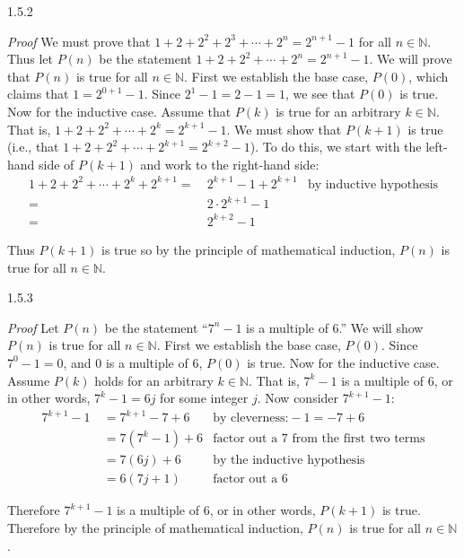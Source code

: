 \documentclass[11pt,]{book}
\makeatletter
\theoremstyle{ptxplainnotitle}
\theoremstyle{ptxplaintitle}
\renewcommand*{\proofname}{Proof}
\renewenvironment{proof}[1][\proofname]{\par
  \pushQED{\qed}%
  \normalfont \topsep6\p@\@plus6\p@\relax
  \trivlist
  \item\relax
    {\itshape
    #1\@addpunct{.}}\hspace\labelsep\ignorespaces
}{%
  \popQED\endtrivlist\@endpefalse
}
\theoremstyle{ptxdefinitionnotitle}
\theoremstyle{ptxdefinitiontitle}
\theoremstyle{ptxdefinitionnotitle}
\theoremstyle{ptxdefinitiontitle}
\theoremstyle{ptxdefinitionnotitle}
\theoremstyle{ptxdefinitiontitle}
\theoremstyle{ptxdefinitiontitlenonumber}
\theoremstyle{ptxdefinitiontitlenonumber}
\numberwithin{equation}{chapter}
\newcommand{\N}{\mathbb N}
\newcommand{\amp}{&}
\makeatother
\begin{document}
\begin{divisionexercise}{1.5.2}
\textbf{}\begin{proof}\hypertarget{proof-5}{}
\hypertarget{p-596}{}%
We must prove that \(1 + 2 + 2^2 + 2^3 + \cdots +2^n = 2^{n+1} - 1\) for all \(n \in \N\). Thus let \(P(n)\) be the statement \(1 + 2 + 2^2 + \cdots + 2^n = 2^{n+1} - 1\). We will prove that \(P(n)\) is true for all \(n \in \N\). First we establish the base case, \(P(0)\), which claims that \(1 = 2^{0+1} -1\). Since \(2^1 - 1 = 2 - 1 = 1\), we see that \(P(0)\) is true. Now for the inductive case. Assume that \(P(k)\) is true for an arbitrary \(k \in \N\). That is, \(1 + 2 + 2^2 + \cdots + 2^k = 2^{k+1} - 1\). We must show that \(P(k+1)\) is true (i.e., that \(1 + 2 + 2^2 + \cdots + 2^{k+1} = 2^{k+2} - 1\)). To do this, we start with the left-hand side of \(P(k+1)\) and work to the right-hand side:%
\begin{align*}
1 + 2 + 2^2 + \cdots + 2^k + 2^{k+1} = \amp ~ 2^{k+1} - 1 + 2^{k+1} \amp \text{by inductive hypothesis}\\
= \amp ~2\cdot 2^{k+1} - 1 \amp\\
= \amp ~ 2^{k+2} - 1 \amp
\end{align*}
%
\par
\hypertarget{p-597}{}%
Thus \(P(k+1)\) is true so by the principle of mathematical induction, \(P(n)\) is true for all \(n \in \N\).%
\end{proof}
\end{divisionexercise}%
\begin{divisionexercise}{1.5.3}
\textbf{}\begin{proof}\hypertarget{proof-6}{}
\hypertarget{p-599}{}%
Let \(P(n)\) be the statement ``\(7^n - 1\) is a multiple of 6.'' We will show \(P(n)\) is true for all \(n \in \N\). First we establish the base case, \(P(0)\). Since \(7^0 - 1 = 0\), and \(0\) is a multiple of 6, \(P(0)\) is true. Now for the inductive case. Assume \(P(k)\) holds for an arbitrary \(k \in \N\). That is, \(7^k - 1\) is a multiple of 6, or in other words, \(7^k - 1 = 6j\) for some integer \(j\). Now consider \(7^{k+1} - 1\):%
\begin{align*}
7^{k+1} - 1 ~ \amp = 7^{k+1} - 7 + 6 \amp \text{by cleverness:} -1 = -7 + 6\\
\amp = 7(7^k - 1) + 6 \amp \text{factor out a 7 from the first two terms}\\
\amp = 7(6j) + 6 \amp \text{by the inductive hypothesis}\\
\amp = 6(7j + 1) \amp \text{factor out a 6}
\end{align*}
%
\par
\hypertarget{p-600}{}%
Therefore \(7^{k+1} - 1\) is a multiple of 6, or in other words, \(P(k+1)\) is true. Therefore by the principle of mathematical induction, \(P(n)\) is true for all \(n \in \N\).%
\end{proof}
\end{divisionexercise}%
\end{document}
